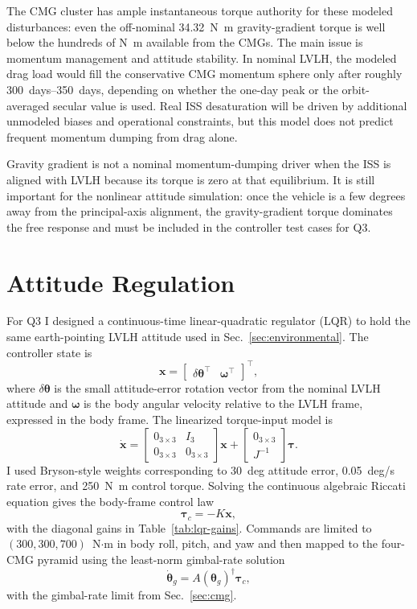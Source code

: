 \documentclass[conference]{IEEEtran}
\begin{document}
The CMG cluster has ample instantaneous torque authority for these
modeled disturbances: even the off-nominal \SI{34.32}{N.m}
gravity-gradient torque is well below the hundreds of \si{N.m}
available from the CMGs.  The main issue is momentum management and
attitude stability.  In nominal LVLH, the modeled drag load would fill
the conservative CMG momentum sphere only after roughly
\SIrange{300}{350}{days}, depending on whether the one-day peak or the
orbit-averaged secular value is used.  Real ISS desaturation will be
driven by additional unmodeled biases and operational constraints, but
this model does not predict frequent momentum dumping from drag alone.

Gravity gradient is not a nominal momentum-dumping driver when the ISS
is aligned with LVLH because its torque is zero at that equilibrium.
It is still important for the nonlinear attitude simulation: once the
vehicle is a few degrees away from the principal-axis alignment, the
gravity-gradient torque dominates the free response and must be included
in the controller test cases for Q3.

\section{Attitude Regulation}
\label{sec:regulation}

For Q3 I designed a continuous-time linear-quadratic regulator (LQR)
to hold the same earth-pointing LVLH attitude used in
Sec.~\ref{sec:environmental}.  The controller state is
\[
  \bm x =
  \begin{bmatrix}
    \delta\bm\theta^\top & \bm\omega^\top
  \end{bmatrix}^\top ,
\]
where $\delta\bm\theta$ is the small attitude-error rotation vector
from the nominal LVLH attitude and $\bm\omega$ is the body angular
velocity relative to the LVLH frame, expressed in the body frame.  The
linearized torque-input model is
\begin{equation}
  \dot{\bm x}
  =
  \begin{bmatrix}
    0_{3\times3} & I_3 \\
    0_{3\times3} & 0_{3\times3}
  \end{bmatrix}\bm x
  +
  \begin{bmatrix}
    0_{3\times3} \\
    J^{-1}
  \end{bmatrix}\bm\tau .
  \label{eq:lqr-linearization}
\end{equation}
I used Bryson-style weights corresponding to
\SI{30}{deg} attitude error, \SI{0.05}{deg/s} rate error, and
\SI{250}{N.m} control torque.  Solving the continuous algebraic
Riccati equation gives the body-frame control law
\[
  \bm\tau_c = -K\bm x,
\]
with the diagonal gains in Table~\ref{tab:lqr-gains}.  Commands are
limited to $(300,300,700)$~N$\cdot$m in body roll, pitch, and yaw and
then mapped to the four-CMG pyramid using the least-norm gimbal-rate
solution
\[
  \dot{\bm\theta}_g = A(\bm\theta_g)^\dagger\bm\tau_c ,
\]
with the gimbal-rate limit from Sec.~\ref{sec:cmg}.
\end{document}
